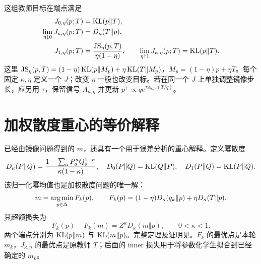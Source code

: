 这组教师目标在端点满足
\begin{align}
J_{0,\eta}(p;T)&=\operatorname{KL}(p\Vert T),\\
\lim_{\eta\downarrow0}J_{\kappa,\eta}(p;T)&=D_\kappa(T\Vert p),\\
J_{1,\eta}(p;T)&=\frac{\operatorname{JS}_\eta(p,T)}{\eta(1-\eta)},
\qquad \lim_{\eta\uparrow1}J_{\kappa,\eta}(p;T)=\operatorname{KL}(p\Vert T).
\end{align}
这里 $\operatorname{JS}_\eta(p,T)=(1-\eta)\operatorname{KL}(p\Vert M_p)+\eta\operatorname{KL}(T\Vert M_p)$，$M_p=(1-\eta)p+\eta T$。每个固定 $\kappa,\eta$ 定义一个 $J$；改变 $\eta$ 一般也改变目标。若在同一个 $J$ 上单独调整镜像步长，应另用 $\tau$，保留信号 $A_{\kappa,\eta}$ 并更新 $p^+\propto q e^{\tau A_{\kappa,\eta}(T/q)}$。

\section{加权散度重心的等价解释}
已经由镜像问题得到的 $m$，还具有一个用于误差分析的重心解释。定义幂散度
\begin{equation}
D_\kappa(P\Vert Q)=\frac{1-\sum_aP_a^\kappa Q_a^{1-\kappa}}{\kappa(1-\kappa)},
\quad D_0(P\Vert Q)=\operatorname{KL}(Q\Vert P),\quad D_1(P\Vert Q)=\operatorname{KL}(P\Vert Q).
\label{eq:power-divergence}
\end{equation}
该归一化幂均值也是加权散度问题的唯一解：
\begin{equation}
m=\operatorname*{arg\,min}_{p\in\Delta}F_k(p),\qquad
F_k(p)=(1-\eta)D_\kappa(q_k\Vert p)+\eta D_\kappa(T\Vert p).
\label{eq:barycenter-problem}
\end{equation}
其超额损失为
\begin{equation}
F_k(p)-F_k(m)=Z^\kappa D_\kappa(m\Vert p),\qquad 0<\kappa<1.
\label{eq:barycenter-gap}
\end{equation}
两个端点分别为 $\operatorname{KL}(p\Vert m)$ 与 $\operatorname{KL}(m\Vert p)$。完整定理及证明见。$F_k$ 的最优点是本轮 $m_k$，$J_{\kappa,\eta}$ 的最优点是原教师 $T$；后面的 inner 损失用于将参数化学生拟合到已经确定的 $m_k$。
